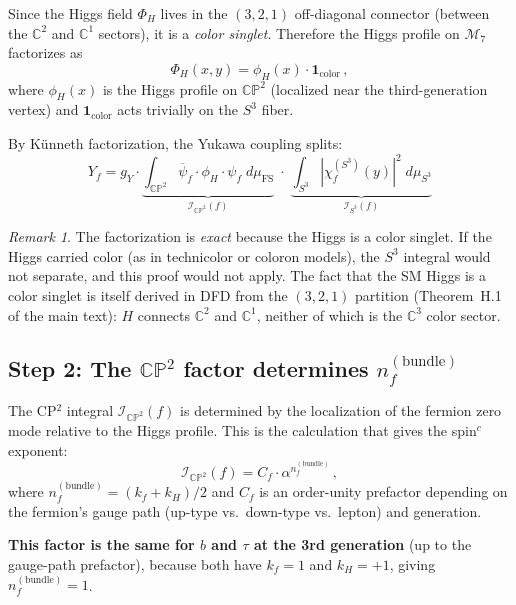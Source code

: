 \documentclass[11pt,a4paper]{article}
\newcommand{\CP}{\mathbb{CP}}
\newcommand{\C}{\mathbb{C}}
\theoremstyle{definition}
\theoremstyle{remark}
\newtheorem{remark}[theorem]{Remark}
\begin{document}
Since the Higgs field $\Phi_H$ lives in the $(3,2,1)$ off-diagonal
connector (between the $\C^2$ and $\C^1$ sectors), it is a
\emph{color singlet}.  Therefore the Higgs profile on $\mathcal{M}_7$
factorizes as
\begin{equation}\label{eq:higgs-factor}
\Phi_H(x, y) = \phi_H(x) \cdot \mathbf{1}_{\text{color}}\,,
\end{equation}
where $\phi_H(x)$ is the Higgs profile on $\CP^2$ (localized near
the third-generation vertex) and $\mathbf{1}_{\text{color}}$ acts
trivially on the $S^3$ fiber.

By K\"unneth factorization, the Yukawa coupling splits:
\begin{equation}\label{eq:kunneth}
\boxed{
Y_f = g_Y \cdot \underbrace{\int_{\CP^2}
\overline{\psi}_f \cdot \phi_H \cdot \psi_f\;d\mu_{\text{FS}}}_{
\displaystyle \mathcal{I}_{\CP^2}(f)}
\;\cdot\;
\underbrace{\int_{S^3}
|\chi_f^{(S^3)}(y)|^2\;d\mu_{S^3}}_{\displaystyle \mathcal{I}_{S^3}(f)}
}
\end{equation}

\begin{remark}
The factorization is \emph{exact} because the Higgs is a color singlet.
If the Higgs carried color (as in technicolor or coloron models), the
$S^3$ integral would not separate, and this proof would not apply.
The fact that the SM Higgs is a color singlet is itself derived in DFD
from the $(3,2,1)$ partition (Theorem~H.1 of the main text): $H$ connects
$\C^2$ and $\C^1$, neither of which is the $\C^3$ color sector.
\end{remark}

\subsection{Step 2: The $\CP^2$ factor determines $n_f^{(\text{bundle})}$}

The CP$^2$ integral $\mathcal{I}_{\CP^2}(f)$ is determined by the
localization of the fermion zero mode relative to the Higgs profile.
This is the calculation that gives the spin$^c$ exponent:
\begin{equation}\label{eq:cp2-integral}
\mathcal{I}_{\CP^2}(f) = C_f \cdot \alpha^{n_f^{(\text{bundle})}}\,,
\end{equation}
where $n_f^{(\text{bundle})} = (k_f + k_H)/2$ and $C_f$ is an
order-unity prefactor depending on the fermion's gauge path (up-type vs.\
down-type vs.\ lepton) and generation.

\textbf{This factor is the same for $b$ and $\tau$ at the 3rd generation}
(up to the gauge-path prefactor), because both have $k_f = 1$ and
$k_H = +1$, giving $n_f^{(\text{bundle})} = 1$.
\end{document}

